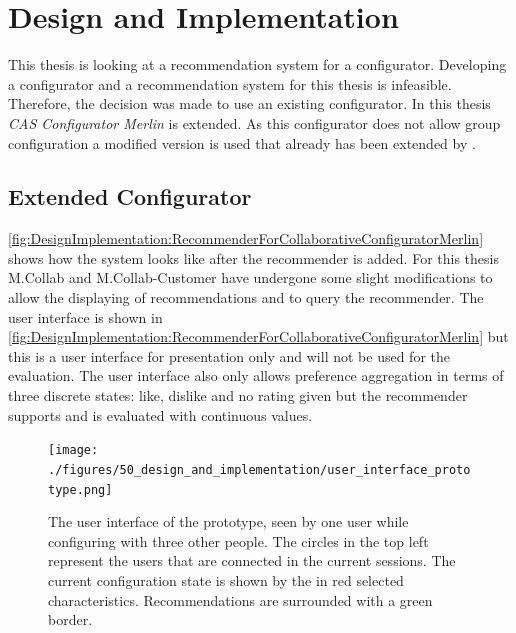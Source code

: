 \chapter{Design and Implementation}
\label{ch:DesignImplementation}

This thesis is looking at a recommendation system for a configurator. Developing a configurator and a recommendation system for this thesis is infeasible. Therefore, the decision was made to use an existing configurator. In this thesis \emph{CAS Configurator Merlin} \cite{IndustrySpecificProduct2020} is extended. As this configurator does not allow group configuration a modified version is used that already has been extended by \citeauthor{raabKollaborativeProduktkonfigurationEchtzeit2019} \cite{raabKollaborativeProduktkonfigurationEchtzeit2019}. 

\FloatBarrier

\section{Extended Configurator}
\label{subsec:DesignImplementation:ExtendedConfigurator}

\autoref{fig:DesignImplementation:RecommenderForCollaborativeConfiguratorMerlin} shows how the system looks like after the recommender is added. For this thesis M.Collab and M.Collab-Customer have undergone some slight modifications to allow the displaying of recommendations and to query the recommender. The user interface is shown in \autoref{fig:DesignImplementation:RecommenderForCollaborativeConfiguratorMerlin} but this is a user interface for presentation only and will not be used for the evaluation. The user interface also only allows preference aggregation in terms of three discrete states: like, dislike and no rating given but the recommender supports and is evaluated with continuous values.

\begin{figure}
    \centering
    \texttt{[image: ./figures/50\_design\_and\_implementation/user\_interface\_prototype.png]}
    \caption{The user interface of the prototype, seen by one user while configuring with three other people. The circles in the top left represent the users that are connected in the current sessions. The current configuration state is shown by the in red selected characteristics. Recommendations are surrounded with a green border.}
    \label{fig:DesignImplementation:UserInterface}
\end{figure}


